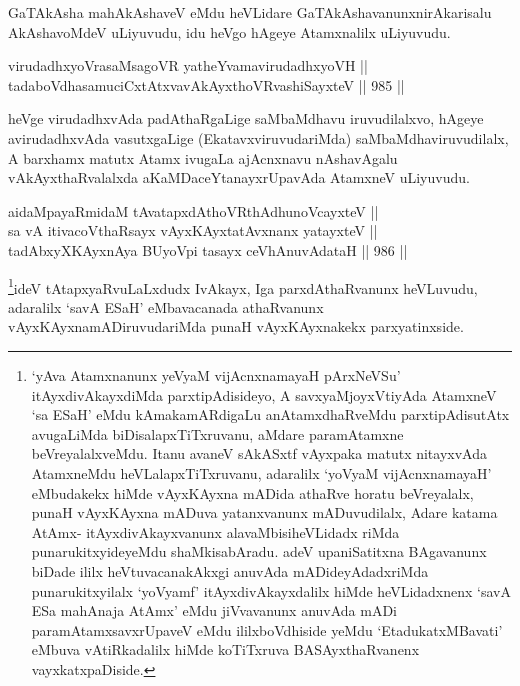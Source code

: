 \begin{artha}
GaTAkAsha mahAkAshaveV eMdu heVLidare GaTAkAshavanunx\break nirAkarisalu AkAshavoMdeV uLiyuvudu, idu heVgo hAgeye Atamxnalilx uLiyuvudu.
\end{artha}


\begin{shl}
virudadhxyoVrasaMsagoVR yatheYvamavirudadhxyoVH || \\
tadaboVdhasamuciCxtAtxvavAkAyxthoVR\s vashiSayxteV \hfill || 985 ||  
\end{shl}

\begin{artha}
heVge virudadhxvAda padAthaRgaLige saMbaMdhavu iruvudilalxvo, hAgeye avirudadhxvAda vasutxgaLige (EkatavxviruvudariMda) saMbaMdhaviruvudilalx, A barxhamx matutx Atamx ivugaLa ajAcnxnavu nAshavAgalu vAkAyxthaRvalalxda aKaMDaceYtanayxrUpavAda AtamxneV uLiyuvudu.
\end{artha}


\begin{shl}
aidaMpayaRmidaM tAvatapxdAthoVR\s thAdhunoVcayxteV || \\
sa vA itivacoVthaRsayx vAyxKAyxtatAvxnanx yatayxteV || \\
tadAbxyXKAyxnAya BUyoV\s pi tasayx ceVhAnuvAdataH \hfill || 986 ||  
\end{shl}

\begin{artha}
\footnote{`yAva Atamxnanunx yeVyaM vijAcnxnamayaH pArxNeVSu' itAyxdivAkayxdiMda parxtipAdisideyo, A savxyaMjoyxVtiyAda AtamxneV `sa ESaH' eMdu kAmakamARdigaLu anAtamxdhaRveMdu parxtipAdisutAtx avugaLiMda biDisalapxTiTxruvanu, aMdare paramAtamxne beVreyalalxveMdu. Itanu avaneV sAkASxtf vAyxpaka matutx nitayxvAda AtamxneMdu heVLalapxTiTxruvanu, adaralilx `yoV\s yaM vijAcnxnamayaH' eMbudakekx hiMde vAyxKAyxna mADida athaRve horatu beVreyalalx, punaH vAyxKAyxna mADuva yatanxvanunx mADuvudilalx, Adare katama AtAmx- itAyxdivAkayxvanunx alavaMbisiheVLidadx riMda punarukitxyideyeMdu shaMkisabAradu. adeV upaniSatitxna BAgavanunx biDade ililx heVtuvacanakAkxgi anuvAda mADideyAdadxriMda punarukitxyilalx `yoV\s yamf' itAyxdivAkayxdalilx hiMde heVLidadxnenx `savA ESa mahAnaja AtAmx' eMdu jiVvavanunx anuvAda mADi paramAtamxsavxrUpaveV eMdu ililxboVdhiside yeMdu `EtadukatxMBavati' eMbuva vAtiRkadalilx hiMde koTiTxruva BASAyxthaRvanenx vayxkatxpaDiside.}ideV tAtapxyaRvuLaLxdudx IvAkayx, Iga parxdAthaRvanunx heVLuvudu, adaralilx `savA ESaH' eMbavacanada athaRvanunx vAyxKAyxnamADiruvudariMda punaH vAyxKAyxnakekx parxyatinxside.
\end{artha}


